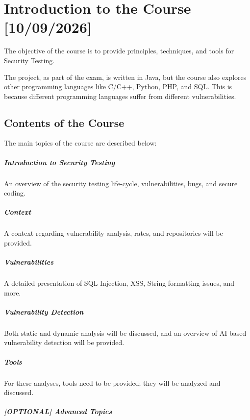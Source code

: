 \chapter{Introduction to the Course [10/09/2026]}
The objective of the course is to provide principles, techniques, and tools for Security Testing.

The project, as part of the exam, is written in Java, but the course also explores other programming languages like C/C++, Python, PHP, and SQL. This is because different programming languages suffer from different vulnerabilities.

\section{Contents of the Course}
The main topics of the course are described below:

\paragraph{Introduction to Security Testing} An overview of the security testing life-cycle, vulnerabilities, bugs, and secure coding.
\paragraph{Context} A context regarding vulnerability analysis, rates, and repositories will be provided.
\paragraph{Vulnerabilities} A detailed presentation of SQL Injection, XSS, String formatting issues, and more. 
\paragraph{Vulnerability Detection} Both static and dynamic analysis will be discussed, and an overview of AI-based vulnerability detection will be provided.
\paragraph{Tools} For these analyses, tools need to be provided; they will be analyzed and discussed.
\paragraph{[OPTIONAL] Advanced Topics} 

